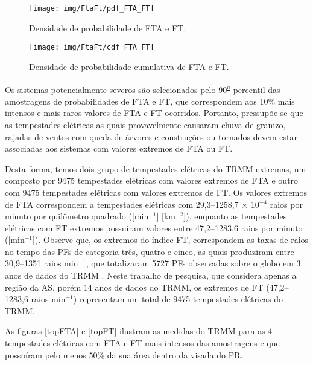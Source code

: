 \begin{figure}[!ht]
  \centering
  \texttt{[image: img/FtaFt/pdf\_FTA\_FT]}      
  \caption{Densidade de probabilidade de FTA e FT.} 
   \label{pdfFTAFT} 
\end{figure}

\begin{figure}[!hb]
  \centering 
  \texttt{[image: img/FtaFt/cdf\_FTA\_FT]} 
  \caption{Densidade de probabilidade cumulativa de FTA e FT.}
  \label{cdfFTAFT}
\end{figure}

Os sistemas potencialmente severos são selecionados pelo 90\textsuperscript{\underline{o}} percentil das amostragens de probabilidades de FTA e FT, que correspondem aos 10\% mais intensos e mais raros valores de FTA e FT ocorridos. Portanto, pressupõe-se que as tempestades elétricas as quais provavelmente causaram chuva de granizo, rajadas de ventos com queda de árvores e construções ou tornados devem estar associadas aos sistemas com valores extremos de FTA ou FT.

Desta forma, temos dois grupo de tempestades elétricas do TRMM extremas, um composto por 9475 tempestades elétricas com valores extremos de FTA e outro com 9475 tempestades elétricas com valores extremos de FT. Os valores extremos de FTA correspondem a tempestades elétricas com {29,3--1258,7 $\times$ 10$^{-4}$} raios por minuto por quilômetro quadrado ([min$^{-1}$] [km$^{-2}$]), enquanto as tempestades elétricas com FT extremos possuíram valores entre {47,2--1283,6} raios por minuto ([min$^{-1}$]). Observe que, os extremos do índice FT, correspondem as taxas de raios no tempo das PFs de categoria três, quatro e cinco, as quais produziram entre 30,9--1351 raios min$^{-1}$, que totalizaram 5727 PFs observadas sobre o globo em 3 anos de dados do TRMM \cite{cecil2005}. Neste trabalho de pesquisa, que considera apenas a região da AS, porém 14 anos de dados do TRMM, os extremos de FT ({47,2--1283,6} raios min$^{-1}$) representam um total de 9475 tempestades elétricas do TRMM.      


As figuras \ref{topFTA} e \ref{topFT} ilustram as medidas do TRMM para as 4 tempestades elétricas com FTA e FT mais intensos das amostragens e que possuíram pelo menos 50\% da sua área dentro da visada do PR. 


